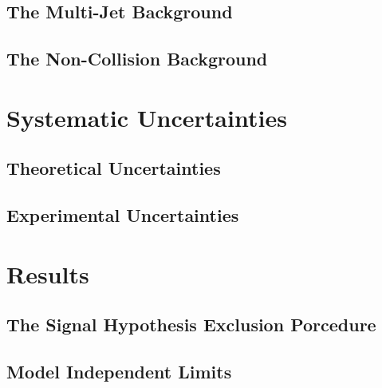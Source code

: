 \documentclass[10pt,twoside,cucitura,classica,english,openany]{toptesi}
\begin{document}


\subsection{The Multi-Jet Background}
\label{sec:multi-jet-background}



\subsection{The Non-Collision Background}
\label{sec:non-coll-backgr}



\section{Systematic Uncertainties}
\label{sec:syst-uncert}



\subsection{Theoretical Uncertainties}
\label{sec:theor-uncert}



\subsection{Experimental Uncertainties}
\label{sec:exper-uncert}



\section{Results}
\label{sec:results}



\subsection{The Signal Hypothesis Exclusion Porcedure}
\label{sec:sign-hypoth-excl}



\subsection{Model Independent Limits}
\label{sec:model-indep-limits}
\end{document}
